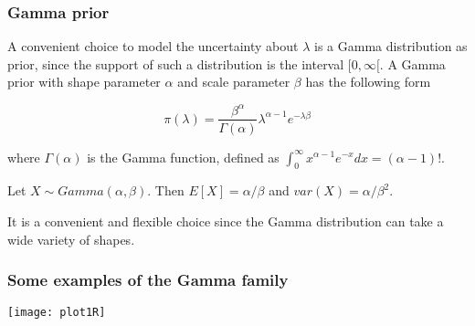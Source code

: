 \documentclass[border=5mm, convert, usenames, dvipsnames,beamer]{standalone}
\begin{document}
\begin{frame}[ fragile]{}

\frametitle{Gamma prior}

\vspace{30}
\noindent
 A convenient choice to model the uncertainty about $\lambda$ is a Gamma distribution as prior, since the support of such a distribution is the interval $[0, \infty[$. A Gamma prior with shape parameter $\alpha$ and scale parameter $\beta$ has the following form

$$
\pi( \lambda) =  \frac{  \beta^{\alpha}   }{ \Gamma(\alpha)  } \lambda^{\alpha - 1}   e^{- \lambda \beta }
$$

\vspace{5}
\noindent
where $\Gamma(\alpha)$ is the Gamma function, defined as $\int_{0}^{\infty}x^{\alpha - 1}  e^{-x}  dx = (\alpha - 1) !$. 

\vspace{5}
\noindent
Let $X \sim Gamma(\alpha, \beta)$. Then $E[X]= \alpha/ \beta$ and $var(X)=\alpha /\beta^2$.

\vspace{5}
\noindent
It is a convenient and flexible choice since the Gamma distribution can take a wide variety of shapes.





\end{frame}






\begin{frame}[ fragile]{}
\frametitle{Some examples of the Gamma family}

\vspace{50}
\noindent

 \texttt{[image: plot1R]}


\end{frame}
\end{document}
